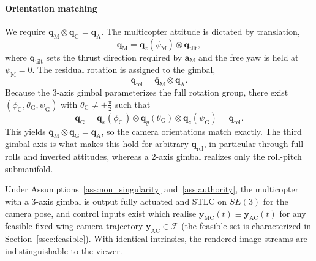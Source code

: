 \documentclass[letterpaper, 10 pt, conference]{ieeeconf}  %
\begin{document}
\paragraph{Orientation matching}
We require $\mathbf{q}_\text{M} \otimes \mathbf{q}_\text{G} = \mathbf{q}_\text{A}$. The multicopter attitude is dictated by translation,
\begin{equation}
\label{eq:q_split_combined}
\mathbf{q}_\text{M} = \mathbf{q}_z(\psi_\text{M}) \otimes \mathbf{q}_\text{tilt},
\end{equation}
where $\mathbf{q}_\text{tilt}$ sets the thrust direction required by $\mathbf{a}_\text{M}$ and the free yaw is held at $\psi_\text{M}=0$. The residual rotation is assigned to the gimbal,
\begin{equation}
\label{eq:q_rel_combined}
\mathbf{q}_\text{rel} = \bar{\mathbf{q}}_\text{M} \otimes \mathbf{q}_\text{A}.
\end{equation}
Because the 3-axis gimbal parameterizes the full rotation group, there exist $(\phi_\text{G},\theta_\text{G},\psi_\text{G})$ with $\theta_\text{G}\neq\pm\frac{\pi}{2}$ such that
\begin{equation}
\label{eq:qG_choice_combined}
\mathbf{q}_\text{G} = \mathbf{q}_x(\phi_\text{G}) \otimes \mathbf{q}_y(\theta_\text{G}) \otimes \mathbf{q}_z(\psi_\text{G}) = \mathbf{q}_\text{rel}.
\end{equation}
This yields $\mathbf{q}_\text{M} \otimes \mathbf{q}_\text{G} = \mathbf{q}_\text{A}$, so the camera orientations match exactly. The third gimbal axis is what makes this hold for arbitrary $\mathbf{q}_\text{rel}$, in particular through full rolls and inverted attitudes, whereas a 2-axis gimbal realizes only the roll-pitch submanifold.

Under Assumptions~\ref{ass:non_singularity} and~\ref{ass:authority}, the multicopter with a 3-axis gimbal is output fully actuated and STLC on $SE(3)$ for the camera pose, and control inputs exist which realise $\mathbf{y}_\text{MC}(t) \equiv \mathbf{y}_\text{AC}(t)$ for any feasible fixed-wing camera trajectory $\mathbf{y}_\text{AC} \in \mathcal{F}$ (the feasible set is characterized in Section~\ref{ssec:feasible}). With identical intrinsics, the rendered image streams are indistinguishable to the viewer.

\end{document}
